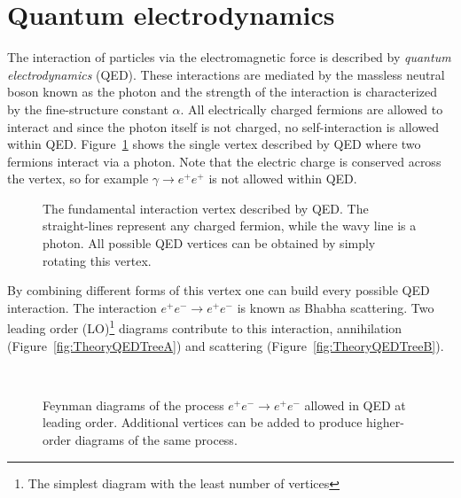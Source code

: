 \section{Quantum electrodynamics}

The interaction of particles via the electromagnetic force is described by \emph{quantum electrodynamics} (QED). These interactions are mediated by the massless neutral boson known as the photon and the strength of the interaction is characterized by the fine-structure constant $\alpha$. All electrically charged fermions are allowed to interact and since the photon itself is not charged, no self-interaction is allowed within QED. Figure~\ref{fig:TheorySimpleQED} shows the single vertex described by QED where two fermions interact via a photon. Note that the electric charge is conserved across the vertex, so for example $\gamma\rightarrow e^{+}e^{+}$ is not allowed within QED.

\begin{figure}[htbp]
  \centering
    
    \caption[The fundamental interaction vertex described by QED.]{The fundamental interaction vertex described by QED. The straight-lines represent any charged fermion, while the wavy line is a photon. All possible QED vertices can be obtained by simply rotating this vertex.}
  \label{fig:TheorySimpleQED}
\end{figure}

By combining different forms of this vertex one can build every possible QED interaction. The interaction $e^{+}e^{-}\rightarrow e^{+}e^{-}$ is known as Bhabha scattering. Two leading order (LO)\footnote{The simplest diagram with the least number of vertices} diagrams contribute to this interaction, annihilation (Figure~\ref{fig:TheoryQEDTreeA}) and scattering (Figure~\ref{fig:TheoryQEDTreeB}).

\begin{figure}[htbp]
  \centering
    \begin{minipage}[][][t]{.47\textwidth}
      \centering
        
      \label{fig:TheoryQEDTreeA}
    \end{minipage}
    \,
    \begin{minipage}[][][t]{.47\textwidth}
      \centering
        
      \label{fig:TheoryQEDTreeB}
    \end{minipage}
    \caption[Feynman diagrams of the process $e^{+}e^{-}\rightarrow e^{+}e^{-}$ allowed in QED at leading order.]{Feynman diagrams of the process $e^{+}e^{-}\rightarrow e^{+}e^{-}$ allowed in QED at leading order. Additional vertices can be added to produce higher-order diagrams of the same process.}
  \label{fig:TheoryQEDTree}
\end{figure}

